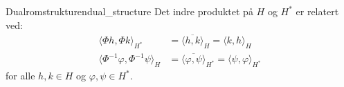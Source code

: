 \begin{corollary}{Dualromstrukturen}{dual_structure}
	Det indre produktet på $H$ og $H^*$ er relatert ved:
	\begin{align}
		\langle \Phi h, \Phi k \rangle_{H^*}              & = \overline{\langle h, k \rangle}_H = \langle k, h \rangle_H                           \\
		\langle \Phi^{-1}\varphi, \Phi^{-1}\psi \rangle_H & = \overline{\langle \varphi, \psi \rangle}_{H^*} = \langle \psi, \varphi \rangle_{H^*}
	\end{align}
	for alle $h, k \in H$ og $\varphi, \psi \in H^*$.
\end{corollary}